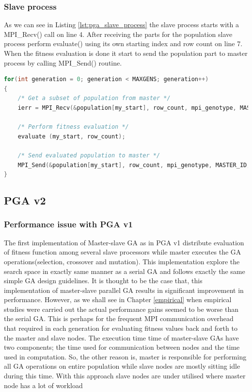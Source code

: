 \subsubsection{Slave process}
As we can see in Listing \ref{lst:pga_slave_process} the slave process starts with a MPI\_Recv() call on line 4. After receiving the parts for the population slave process perform evaluate() using its own starting index and row count on line 7. When the fitness evaluation is done it start to send the population part to master process by calling MPI\_Send() routine.


\begin{lstlisting}[language=C, caption={The slave\_process() procedure.}, label={lst:pga_slave_process}]
for(int generation = 0; generation < MAXGENS; generation++)
{
    /* Get a subset of population from master */
    ierr = MPI_Recv(&population[my_start], row_count, mpi_genotype, MASTER_ID, SEND_DATA_TAG, MPI_COMM_WORLD, &status);
        
    /* Perform fitness evaluation */
    evaluate (my_start, row_count);
        
    /* Send evaluated population to master */
    MPI_Send(&population[my_start], row_count, mpi_genotype, MASTER_ID, RETN_DATA_TAG, MPI_COMM_WORLD);
}
\end{lstlisting}


\subsection{PGA v2}
\subsubsection{Performance issue with PGA v1}
The first implementation of Master-slave GA as in PGA v1 distribute evaluation of fitness function among several slave processors while master executes the GA operations(selection, crossover and mutation). This implementation explore the search space in exactly same manner as a serial GA and follows exactly the same simple GA design guidelines. It is thought to be the case that, this implementation of master-slave parallel GA results in significant improvement in performance. However, as we shall see in Chapter \ref{empirical} when empirical studies were carried out the actual performance gains seemed to be worse than the serial GA. This is perhaps for the frequent MPI communication overhead that required in each generation for evaluating fitness values back and forth to the master and slave nodes. The execution time time of master-slave GAs have two components; the time used for communication between nodes and the time used in computation. So, the other reason is, master is responsible for performing all GA operations on entire population while slave nodes are mostly sitting idle during this time. With this approach slave nodes are under utilised where master node has a lot of workload 

